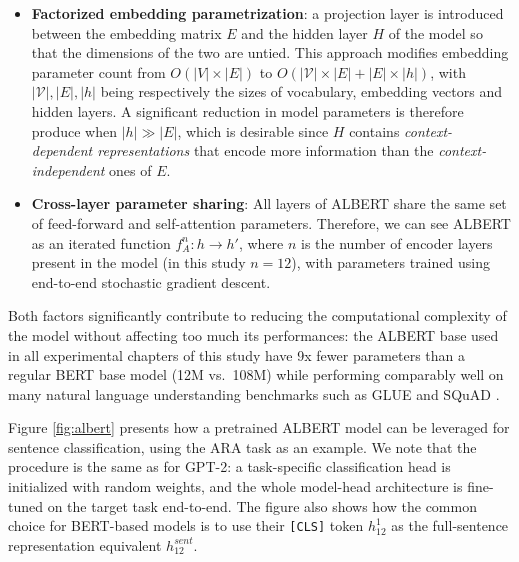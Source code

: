 \documentclass[a4paper, nobind]{templates/ociamthesis}
\begin{document}
\begin{itemize}
\item
  \textbf{Factorized embedding parametrization}: a projection layer is introduced between the embedding matrix \(E\) and the hidden layer \(H\) of the model so that the dimensions of the two are untied. This approach modifies embedding parameter count from \(O(|V| \times |E|)\) to \(O(|\mathcal{V}| \times |E| + |E| \times |h|)\), with \(|\mathcal{V}|, |E|, |h|\) being respectively the sizes of vocabulary, embedding vectors and hidden layers. A significant reduction in model parameters is therefore produce when \(|h| \gg |E|\), which is desirable since \(H\) contains \emph{context-dependent representations} that encode more information than the \emph{context-independent} ones of \(E\).
\item
  \textbf{Cross-layer parameter sharing}: All layers of ALBERT share the same set of feed-forward and self-attention parameters. Therefore, we can see ALBERT as an iterated function \(f_A^n: h \rightarrow h'\), where \(n\) is the number of encoder layers present in the model (in this study \(n=12\)), with parameters trained using end-to-end stochastic gradient descent.
\end{itemize}

Both factors significantly contribute to reducing the computational complexity of the model without affecting too much its performances: the ALBERT base used in all experimental chapters of this study have 9x fewer parameters than a regular BERT base model (12M vs.~108M) while performing comparably well on many natural language understanding benchmarks such as GLUE \autocite{wang-etal-2018-glue} and SQuAD \autocite{rajpurkar-etal-2016-squad}.

Figure \ref{fig:albert} presents how a pretrained ALBERT model can be leveraged for sentence classification, using the ARA task as an example. We note that the procedure is the same as for GPT-2: a task-specific classification head is initialized with random weights, and the whole model-head architecture is fine-tuned on the target task end-to-end. The figure also shows how the common choice for BERT-based models is to use their \texttt{{[}CLS{]}} token \(h_{12}^{1}\) as the full-sentence representation equivalent \(h_{12}^{sent}\).
\end{document}
